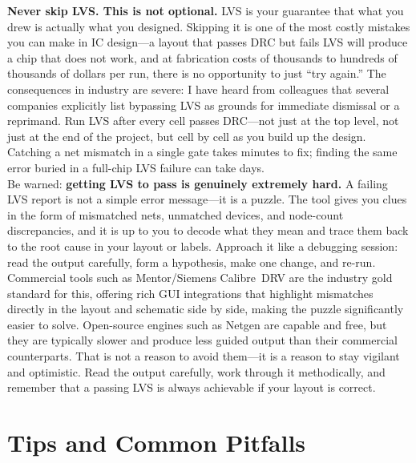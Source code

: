 \documentclass[11pt]{article}
\begin{document}
\begin{tcolorbox}[
  colback  = red!8!white,
  colframe = red!70!black,
  fonttitle= \bfseries,
  title    = Important,
  breakable,
]
\textbf{Never skip LVS. This is not optional.}
LVS is your guarantee that what you drew is actually what you designed.
Skipping it is one of the most costly mistakes you can make in IC
design---a layout that passes DRC but fails LVS will produce a chip that
does not work, and at fabrication costs of thousands to hundreds of
thousands of dollars per run, there is no opportunity to just ``try
again.''
The consequences in industry are severe: I have heard from colleagues
that several companies explicitly
list bypassing LVS as grounds for immediate dismissal or a reprimand.
Run LVS after every cell passes DRC---not just at the top level, not
just at the end of the project, but cell by cell as you build up the
design.
Catching a net mismatch in a single gate takes minutes to fix; finding
the same error buried in a full-chip LVS failure can take days.\\
 
Be warned: \textbf{getting LVS to pass is genuinely extremely hard.}
A failing LVS report is not a simple error message---it is a puzzle.
The tool gives you clues in the form of mismatched nets, unmatched
devices, and node-count discrepancies, and it is up to you to decode
what they mean and trace them back to the root cause in your layout or
labels.
Approach it like a debugging session: read the output carefully, form a
hypothesis, make one change, and re-run. \\
 
Commercial tools such as Mentor/Siemens Calibre~DRV are the
industry gold standard for this, offering rich GUI integrations that
highlight mismatches directly in the layout and schematic side by side,
making the puzzle significantly easier to solve.
Open-source engines such as Netgen are capable and free, but they are
typically slower and produce less guided output than their commercial
counterparts.
That is not a reason to avoid them---it is a reason to stay
vigilant and optimistic.
Read the output carefully, work through it methodically, and remember
that a passing LVS is always achievable if your layout is correct.
\end{tcolorbox}

\section{Tips and Common Pitfalls}
\end{document}
